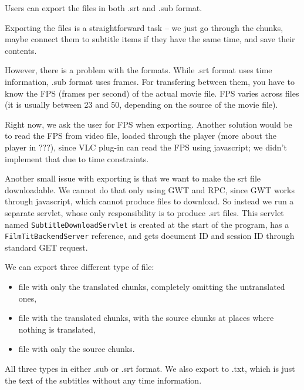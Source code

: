 Users can export the files in both .srt and .sub format.

Exporting the files is a straightforward task -- we just go through the chunks, maybe connect them to subtitle items if they have the same time, and save their contents.

However, there is a problem with the formats. While .srt format uses time information, .sub format uses frames. For transfering between them, you have to know the FPS (frames per second) of the actual movie file. FPS varies across files (it is usually between 23 and 50, depending on the source of the movie file). 

Right now, we ask the user for FPS when exporting. Another solution would be to read the FPS from video file, loaded through the player (more about the player in ???), since VLC plug-in can read the FPS using javascript; we didn't implement that due to time constraints.

Another small issue with exporting is that we want to make the srt file downloadable. We cannot do that only using GWT and RPC, since GWT works through javascript, which cannot produce files to download. So instead we run a separate servlet, whose only responsibility is to produce .srt files. This servlet named \texttt{SubtitleDownloadServlet} is created at the start of the program, has a \texttt{FilmTitBackendServer} reference, and gets document ID and session ID through standard GET request.

We can export three different type of file:
\begin{itemize}
    \item file with only the translated chunks, completely omitting the untranslated ones,
    \item file with the translated chunks, with the source chunks at places where nothing is translated,
    \item file with only the source chunks.
\end{itemize}
All three types in either .sub or .srt format. We also export to .txt, which is just the text of the subtitles without any time information.